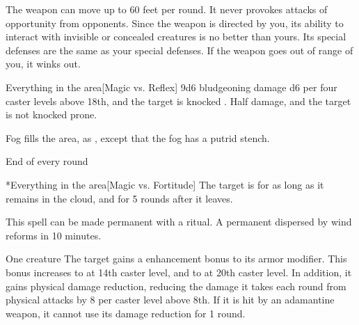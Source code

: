 The weapon can move up to 60 feet per round. It never provokes attacks of opportunity from opponents. Since the weapon is directed by you, its ability to interact with invisible or concealed creatures is no better than yours. Its special defenses are the same as your special defenses. If the weapon goes out of range of you, it winks out.

\spelldur{\durshort \dismissable}
\begin{spelltarget}{Everything in the area}[Magic vs. Reflex]
    \spellsuccess 9d6 bludgeoning damage \add d6 per four caster levels above 18th, and the target is knocked \prone.
    \spellfailure Half damage, and the target is not knocked prone.
\end{spelltarget}

\spelldur{\durshort}
\spellline
\spelleffect Fog fills the area, as , except that the fog has a putrid stench.
\begin{spelltrigger}{End of every round}
    \begin{spelltarget}*{Everything in the area}[Magic vs. Fortitude]
        \spellsuccess The target is \sickened for as long as it remains in the cloud, and for 5 rounds after it leaves.
    \end{spelltarget}
\end{spelltrigger}
\spellnotes This spell can be made permanent with a  ritual. A permanent  dispersed by wind reforms in 10 minutes. \fogspellnotes \fogwindspellnotes

\spelldur{\durshort}
\begin{spelltarget}{One creature}
    \spelleffect The target gains a  enhancement bonus to its armor modifier. This bonus increases to  at 14th caster level, and to  at 20th caster level. In addition, it gains physical damage reduction, reducing the damage it takes each round from physical attacks by 8  per caster level above 8th. If it is hit by an adamantine weapon, it cannot use its damage reduction for 1 round.
\end{spelltarget}


